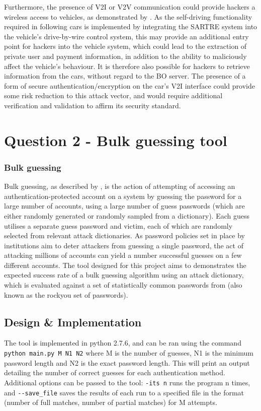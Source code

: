 \documentclass[british,11pt,a4paper]{article}
\begin{document}
Furthermore, the presence of V2I or V2V communication could provide hackers a wireless access to vehicles, as demonstrated by \citet{Curri2015-zo}. As the self-driving functionality required in following cars is implemented by integrating the SARTRE system into the vehicle’s drive-by-wire control system, this may provide an additional entry point for hackers into the vehicle system, which could lead to the extraction of private user and payment information, in addition to the ability to maliciously affect the vehicle’s behaviour. It is therefore also possible for hackers to retrieve information from the cars, without regard to the BO server. The presence of a form of secure authentication/encryption on the car’s V2I interface could provide some risk reduction to this attack vector, and would require additional verification and validation to affirm its security standard.





\clearpage


\section{Question 2 - Bulk guessing tool}

\subsubsection{Bulk guessing}
Bulk guessing, as described by \citet{Florencio2007-yp}, is the action of attempting of accessing an authentication-protected account on a system by guessing the password for a large number of accounts, using a large number of guess passwords (which are either randomly generated or randomly sampled from a dictionary). Each guess utilises a separate guess password and victim, each of which are randomly selected from relevant attack dictionaries. As password policies set in place by institutions aim to deter attackers from guessing a single password, the act of attacking millions of accounts can yield a number successful guesses on a few different accounts. The tool designed for this project aims to demonstrates the expected success rate of a bulk guessing algorithm using an attack dictionary, which is evaluated against a set of statistically common passwords from \citet{Cubrilovic2009-wu} (also known as the rockyou set of passwords).

\subsection{Design \& Implementation}
The tool is implemented in python 2.7.6, and can be ran using the command \lstinline{python main.py M N1 N2} where M is the number of guesses, N1 is the minimum password length and N2 is the exact password length. This will print an output detailing the number of correct guesses for each authentication method. Additional options can be passed to the tool: \lstinline{-its n} runs the program n times, and \lstinline{--save_file} saves the results of each run to a specified file in the format (number of full matches, number of partial matches) for M attempts.
\end{document}
